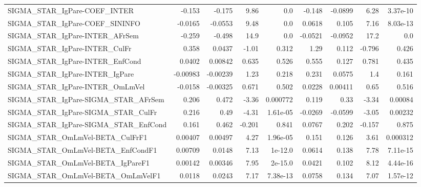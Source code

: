 \begin{tabular}{lrrrrrrrr}
SIGMA\_STAR\_IgPare-COEF\_INTER          &      -0.153 &       -0.175 &    9.86 &      0.0 &     -0.148 &     -0.0899 &         6.28 &      3.37e-10 \\
SIGMA\_STAR\_IgPare-COEF\_SININFO        &     -0.0165 &      -0.0553 &    9.48 &      0.0 &     0.0618 &       0.105 &         7.16 &      8.03e-13 \\
SIGMA\_STAR\_IgPare-INTER\_AFrSem        &      -0.259 &       -0.498 &    14.9 &      0.0 &    -0.0521 &     -0.0952 &         17.2 &           0.0 \\
SIGMA\_STAR\_IgPare-INTER\_CulFr         &       0.358 &       0.0437 &   -1.01 &    0.312 &       1.29 &       0.112 &       -0.796 &         0.426 \\
SIGMA\_STAR\_IgPare-INTER\_EnfCond       &      0.0402 &      0.00842 &   0.635 &    0.526 &      0.555 &       0.127 &        0.781 &         0.435 \\
SIGMA\_STAR\_IgPare-INTER\_IgPare        &    -0.00983 &     -0.00239 &    1.23 &    0.218 &      0.231 &      0.0575 &          1.4 &         0.161 \\
SIGMA\_STAR\_IgPare-INTER\_OmLmVel       &     -0.0158 &     -0.00325 &   0.671 &    0.502 &     0.0228 &     0.00411 &         0.65 &         0.516 \\
SIGMA\_STAR\_IgPare-SIGMA\_STAR\_AFrSem   &       0.206 &        0.472 &   -3.36 & 0.000772 &      0.119 &        0.33 &        -3.34 &       0.00084 \\
SIGMA\_STAR\_IgPare-SIGMA\_STAR\_CulFr    &       0.216 &         0.49 &   -4.31 & 1.61e-05 &    -0.0269 &     -0.0599 &        -3.05 &       0.00232 \\
SIGMA\_STAR\_IgPare-SIGMA\_STAR\_EnfCond  &       0.161 &        0.462 &  -0.201 &    0.841 &     0.0767 &       0.202 &       -0.157 &         0.875 \\
SIGMA\_STAR\_OmLmVel-BETA\_CulFrF1       &     0.00407 &      0.00497 &    4.27 & 1.96e-05 &      0.151 &       0.126 &         3.61 &      0.000312 \\
SIGMA\_STAR\_OmLmVel-BETA\_EnfCondF1     &     0.00709 &       0.0148 &    7.13 &  1e-12.0 &     0.0614 &       0.138 &         7.78 &      7.11e-15 \\
SIGMA\_STAR\_OmLmVel-BETA\_IgPareF1      &     0.00142 &      0.00346 &    7.95 &  2e-15.0 &     0.0421 &       0.102 &         8.12 &      4.44e-16 \\
SIGMA\_STAR\_OmLmVel-BETA\_OmLmVelF1     &      0.0118 &       0.0243 &    7.17 & 7.38e-13 &     0.0758 &       0.134 &         7.07 &      1.57e-12 \\

\end{tabular}
